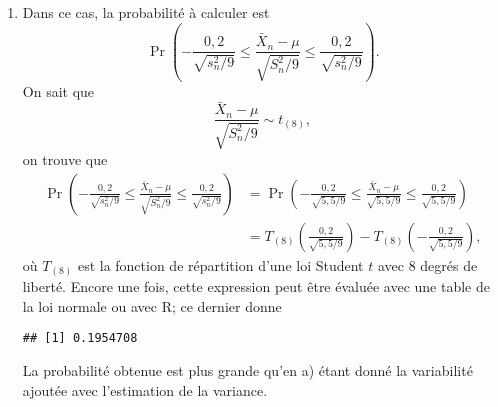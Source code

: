 \begin{solution}{2.22}
\begin{enumerate}
\item Dans ce cas, la probabilité à calculer est
$$
 \Pr\left(-\frac{0,2}{\sqrt{s_n^2/9}} \le \frac{\bar X_n - \mu}{\sqrt{S_n^2/9}} \le \frac{0,2}{\sqrt{s_n^2/9}} \right).
$$
On sait que
$$
\frac{\bar X_n - \mu}{\sqrt{S_n^2/9}} \sim t_{(8)},
$$
on trouve que
\begin{align*}
 \Pr\left(-\frac{0,2}{\sqrt{s_n^2/9}} \le \frac{\bar X_n - \mu}{\sqrt{S_n^2/9}} \le \frac{0,2}{\sqrt{s_n^2/9}} \right) & =  \Pr\left(-\frac{0,2}{\sqrt{5,5/9}} \le \frac{\bar X_n - \mu}{\sqrt{5,5/9}} \le \frac{0,2}{\sqrt{5,5/9}} \right) \\
 &= T_{(8)}\left(\frac{0,2}{\sqrt{5,5/9}} \right) - T_{(8)} \left(-\frac{0,2}{\sqrt{5,5/9}} \right),
\end{align*}
où $T_{(8)}$ est la fonction de répartition d'une loi Student $t$ avec $8$ degrés de liberté. Encore une fois, cette expression peut être évaluée avec une table de la loi normale ou avec \textsf{R}; ce dernier donne
\begin{knitrout}
\color{fgcolor}\begin{kframe}
\begin{alltt}
\hlstd{(}\hlopt{/}\hlstd{(}\hlopt{/}\hlstd{),}\hlstd{=}\hlstd{)} \hlopt{-}\hlstd{(}\hlopt{-}\hlopt{/}\hlstd{(}\hlopt{/}\hlstd{),}\hlstd{=}\hlstd{)}
\end{alltt}
\begin{verbatim}
## [1] 0.1954708
\end{verbatim}
\end{kframe}
\end{knitrout}
La probabilité obtenue est plus grande qu'en a) étant donné la variabilité ajoutée avec l'estimation de la variance.
\end{enumerate}
\end{solution}
